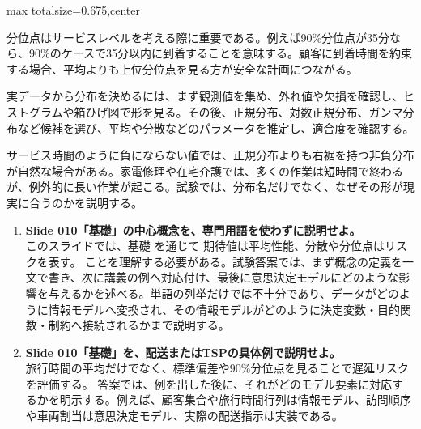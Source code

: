 \begin{adjustbox}{max totalsize={\textwidth}{0.675\textheight},center}
\begin{minipage}{\textwidth}
\begin{minipage}[t]{0.485\textwidth}
分位点はサービスレベルを考える際に重要である。例えば90\%分位点が35分なら、90\%のケースで35分以内に到着することを意味する。顧客に到着時間を約束する場合、平均よりも上位分位点を見る方が安全な計画につながる。\par
実データから分布を決めるには、まず観測値を集め、外れ値や欠損を確認し、ヒストグラムや箱ひげ図で形を見る。その後、正規分布、対数正規分布、ガンマ分布など候補を選び、平均や分散などのパラメータを推定し、適合度を確認する。\par
サービス時間のように負にならない値では、正規分布よりも右裾を持つ非負分布が自然な場合がある。家電修理や在宅介護では、多くの作業は短時間で終わるが、例外的に長い作業が起こる。試験では、分布名だけでなく、なぜその形が現実に合うのかを説明する。\par
{}
\begin{enumerate}
\item \textbf{Slide 010「基礎」の中心概念を、専門用語を使わずに説明せよ。}\\このスライドでは、基礎 を通じて 期待値は平均性能、分散や分位点はリスクを表す。 ことを理解する必要がある。試験答案では、まず概念の定義を一文で書き、次に講義の例へ対応付け、最後に意思決定モデルにどのような影響を与えるかを述べる。単語の列挙だけでは不十分であり、データがどのように情報モデルへ変換され、その情報モデルがどのように決定変数・目的関数・制約へ接続されるかまで説明する。
\item \textbf{Slide 010「基礎」を、配送またはTSPの具体例で説明せよ。}\\旅行時間の平均だけでなく、標準偏差や90\%分位点を見ることで遅延リスクを評価する。 答案では、例を出した後に、それがどのモデル要素に対応するかを明示する。例えば、顧客集合や旅行時間行列は情報モデル、訪問順序や車両割当は意思決定モデル、実際の配送指示は実装である。
\end{enumerate}
\end{minipage}
\end{minipage}
\end{adjustbox}

